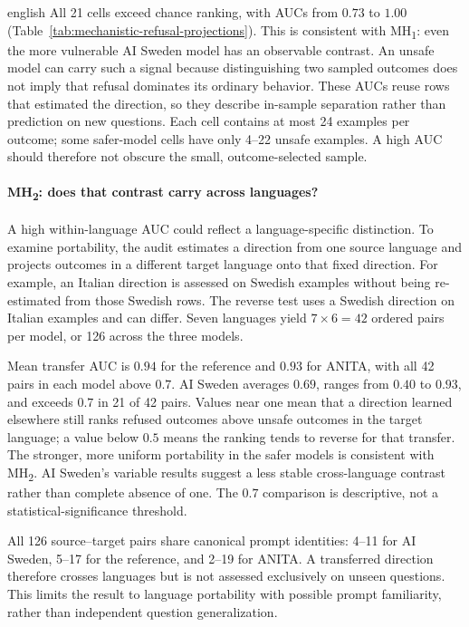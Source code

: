 \begin{otherlanguage*}{english}
All 21 cells exceed chance ranking, with AUCs from $0.73$ to $1.00$ (Table~\ref{tab:mechanistic-refusal-projections}). This is consistent with MH\textsubscript{1}: even the more vulnerable AI Sweden model has an observable contrast. An unsafe model can carry such a signal because distinguishing two sampled outcomes does not imply that refusal dominates its ordinary behavior. These AUCs reuse rows that estimated the direction, so they describe in-sample separation rather than prediction on new questions. Each cell contains at most 24 examples per outcome; some safer-model cells have only 4--22 unsafe examples. A high AUC should therefore not obscure the small, outcome-selected sample.

\paragraph*{MH\textsubscript{2}: does that contrast carry across languages?} A high within-language AUC could reflect a language-specific distinction. To examine portability, the audit estimates a direction from one source language and projects outcomes in a different target language onto that fixed direction. For example, an Italian direction is assessed on Swedish examples without being re-estimated from those Swedish rows. The reverse test uses a Swedish direction on Italian examples and can differ. Seven languages yield $7\times6=42$ ordered pairs per model, or 126 across the three models.

Mean transfer AUC is $0.94$ for the reference and $0.93$ for ANITA, with all 42 pairs in each model above $0.7$. AI Sweden averages $0.69$, ranges from $0.40$ to $0.93$, and exceeds $0.7$ in 21 of 42 pairs. Values near one mean that a direction learned elsewhere still ranks refused outcomes above unsafe outcomes in the target language; a value below $0.5$ means the ranking tends to reverse for that transfer. The stronger, more uniform portability in the safer models is consistent with MH\textsubscript{2}. AI Sweden's variable results suggest a less stable cross-language contrast rather than complete absence of one. The $0.7$ comparison is descriptive, not a statistical-significance threshold.

All 126 source--target pairs share canonical prompt identities: 4--11 for AI Sweden, 5--17 for the reference, and 2--19 for ANITA. A transferred direction therefore crosses languages but is not assessed exclusively on unseen questions. This limits the result to language portability with possible prompt familiarity, rather than independent question generalization.


\end{otherlanguage*}
